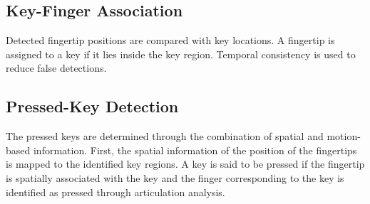 \subsection{Key-Finger Association}

Detected fingertip positions are compared with key locations.
A fingertip is assigned to a key if it lies inside the key region.
Temporal consistency is used to reduce false detections.

\subsection{Pressed-Key Detection}

The pressed keys are determined through the combination of spatial and motion-based information. First, the spatial information of the position of the fingertips is mapped to the identified key regions. A key is said to be pressed if the fingertip is spatially associated with the key and the finger corresponding to the key is identified as pressed through articulation analysis.
